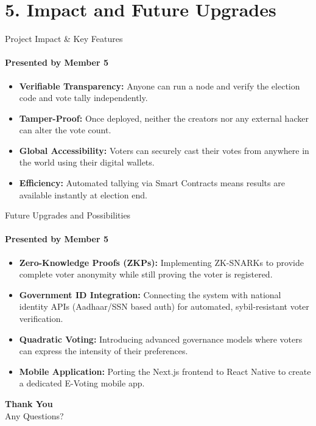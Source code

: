 \documentclass[aspectratio=169]{beamer}	%
\begin{document}
\section{5. Impact and Future Upgrades}

\begin{frame}{Project Impact \& Key Features}
\framesubtitle{Presented by Member 5}
\begin{itemize}
    \item \textbf{Verifiable Transparency:} Anyone can run a node and verify the election code and vote tally independently.
    \item \textbf{Tamper-Proof:} Once deployed, neither the creators nor any external hacker can alter the vote count.
    \item \textbf{Global Accessibility:} Voters can securely cast their votes from anywhere in the world using their digital wallets.
    \item \textbf{Efficiency:} Automated tallying via Smart Contracts means results are available instantly at election end.
\end{itemize}
\end{frame}

\begin{frame}{Future Upgrades and Possibilities}
\framesubtitle{Presented by Member 5}
\begin{itemize}
    \item \textbf{Zero-Knowledge Proofs (ZKPs):} Implementing ZK-SNARKs to provide complete voter anonymity while still proving the voter is registered.
    \item \textbf{Government ID Integration:} Connecting the system with national identity APIs (Aadhaar/SSN based auth) for automated, sybil-resistant voter verification.
    \item \textbf{Quadratic Voting:} Introducing advanced governance models where voters can express the intensity of their preferences.
    \item \textbf{Mobile Application:} Porting the Next.js frontend to React Native to create a dedicated E-Voting mobile app.
\end{itemize}
\end{frame}

\begin{frame}
    \begin{center}
        \Huge \textbf{Thank You}\\
        \vspace{0.5cm}
        \large Any Questions?
    \end{center}
\end{frame}
\end{document}
